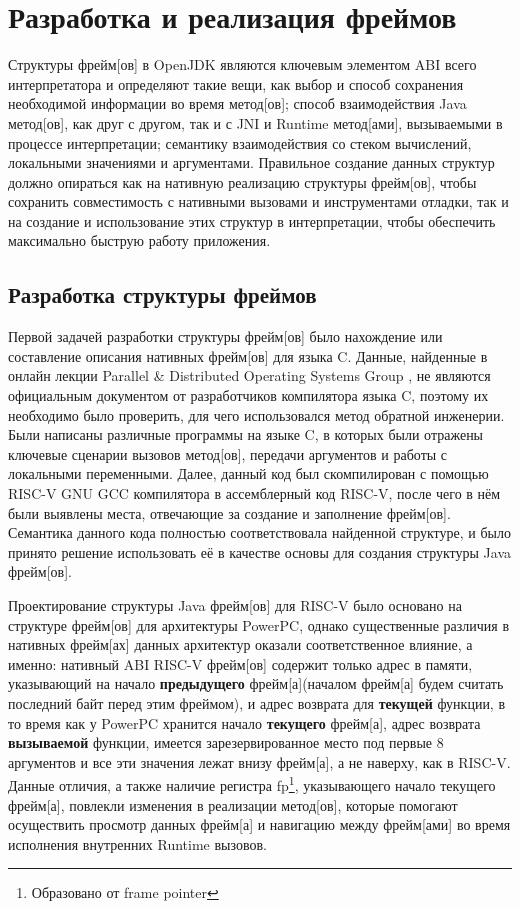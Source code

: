 \section{Разработка и реализация фреймов}

Структуры \gls{фрейм}[ов] в OpenJDK являются ключевым элементом ABI всего интерпретатора и определяют такие вещи, как выбор и способ сохранения необходимой информации во время  \gls{метод}[ов]; способ взаимодействия Java \gls{метод}[ов], как друг с другом, так и с JNI и Runtime \gls{метод}[ами], вызываемыми в процессе интерпретации; семантику взаимодействия со стеком вычислений, локальными значениями и аргументами. Правильное создание данных структур должно опираться как на нативную реализацию структуры \gls{фрейм}[ов], чтобы сохранить совместимость с нативными вызовами и инструментами отладки, так и на создание и использование этих структур в интерпретации, чтобы обеспечить максимально быструю работу приложения.


\subsection{Разработка структуры фреймов}

Первой задачей разработки структуры \gls{фрейм}[ов] было нахождение или составление описания нативных \gls{фрейм}[ов] для языка C. Данные, найденные в онлайн лекции Parallel \& Distributed Operating Systems Group \cite{lecture:frames}, не являются официальным документом от разработчиков компилятора языка C, поэтому их необходимо было проверить, для чего использовался \gls{метод} обратной инженерии. Были написаны различные программы на языке C, в которых были отражены ключевые сценарии вызовов \gls{метод}[ов], передачи аргументов и работы с локальными переменными. Далее, данный код был скомпилирован с помощью RISC-V GNU GCC \cite{riscv:gnu} компилятора в ассемблерный код RISC-V, после чего в нём были выявлены места, отвечающие за создание и заполнение \gls{фрейм}[ов]. Семантика данного кода полностью соответствовала найденной структуре, и было принято решение использовать её в качестве основы для создания структуры Java \gls{фрейм}[ов]. 

Проектирование структуры Java \gls{фрейм}[ов] для RISC-V было основано на структуре \gls{фрейм}[ов] для архитектуры PowerPC, однако существенные различия в нативных \gls{фрейм}[ах] данных архитектур оказали соответственное влияние, а именно: нативный ABI RISC-V \gls{фрейм}[ов] содержит только адрес в памяти, указывающий на начало \textbf{предыдущего} \gls{фрейм}[а](началом \gls{фрейм}[а] будем считать последний байт перед этим фреймом), и адрес возврата для \textbf{текущей} функции, в то время как у PowerPC хранится начало \textbf{текущего} \gls{фрейм}[а], адрес возврата \textbf{вызываемой} функции, имеется зарезервированное место под первые 8 аргументов и все эти значения лежат внизу \gls{фрейм}[а], а не наверху, как в RISC-V.
Данные отличия, а также наличие регистра fp\footnote{Образовано от frame pointer}, указывающего начало текущего \gls{фрейм}[а], повлекли изменения в реализации \gls{метод}[ов], которые помогают осуществить просмотр данных \gls{фрейм}[а] и навигацию между \gls{фрейм}[ами] во время исполнения внутренних Runtime вызовов.

